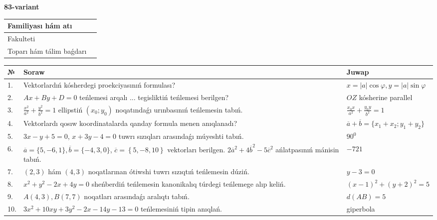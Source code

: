 \documentclass{article}
\begin{document}
\egroup

\newpage


\textbf{83-variant}\\

\bgroup
\def\arraystretch{1.6} %

\begin{tabular}{|m{5.7cm}|m{9.5cm}|}
\hline
Familiyası hám atı & \\
\hline
Fakulteti  & \\
\hline
Toparı hám tálim baǵdarı  & \\
\hline
\end{tabular}

\vspace{1cm}

\begin{tabular}{|m{0.7cm}|m{10cm}|m{4cm}|}
\hline
№ & Soraw & Juwap \\
\hline
1. & Vektorlardıń kósherdegi proekciyasınıń formulası? & $x=|a|\cos\varphi, y=|a|\sin\varphi$ \\
\hline
2. & $Ax+By+D=0$ teńlemesi arqalı ... tegisliktiń teńlemesi berilgen? & $OZ$ kósherine parallel \\
\hline
3. & $\frac{x^2}{a^2}+\frac{y^2}{b^2}=1$ ellipstiń $(x_0;y_0)$ noqatındaǵı urınbasınıń teńlemesin tabıń. & $\frac{x_0x}{a^2}+\frac{y_0y}{b^2}=1$ \\
\hline
4. & Vektorlardı qosıw koordinatalarda qanday formula menen anıqlanadı? & $\overline{a}+\overline{b}=\{x_1+x_2;y_1+y_2\}$ \\
\hline
5. & $3x-y+5=0$, $x+3y-4=0$ tuwrı sızıqları arasındaǵı múyeshti tabıń. & $90^{0}$ \\
\hline
6. & $\overline{a}=\{5,-6, 1 \}, \overline{b}=\{-4, 3, 0 \} $, $\overline{c}=\left\{ 5,-8, 10 \right\}$ vektorları berilgen. $2{\overline{a}}^{2}+4{\overline{b}}^{2}-5{\overline{c}}^{2}$ ańlatpasınıń mánisin tabıń. & $-721$ \\
\hline
7. & $(2, 3)$ hám $(4, 3)$ noqatlarınan ótiwshi tuwrı sızıqtıń teńlemesin dúziń. & $ y-3=0$ \\
\hline
8. & $x^{2}+y^{2}-2x+4y=0$ sheńberdiń teńlemesin kanonikalıq túrdegi teńlemege alıp keliń. & $(x-1)^{2}+(y+2)^{2}=5$ \\
\hline
9. & $A(4, 3), B(7, 7)$ noqatları arasındaǵı aralıqtı tabıń. & $d(AB)=5$ \\
\hline
10. & $3x^{2}+10xy+3y^{2}-2x-14y-13=0$ teńlemesiniń tipin anıqlań. & giperbola \\
\hline
\end{tabular}
\end{document}
